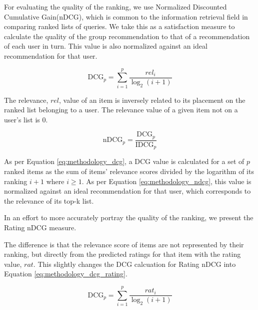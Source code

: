 \label{sec:methodology_ndcg}
For evaluating the quality of the ranking, we use Normalized Discounted Cumulative Gain(nDCG), which is common to the information retrieval field in comparing ranked lists of queries\cite{ndcg}. We take this as a satisfaction measure to calculate the quality of the group recommendation to that of a recommendation of each user in turn. This value is also normalized against an ideal recommendation for that user.


\begin{equation}\label{eq:methodology_dcg}
\text{DCG}_p = \sum_{i=1}^{p}\frac{\textit{rel}_i}{\log_2(i + 1)}
\end{equation}

The relevance, $rel$, value of an item is inversely related to its placement on the ranked list belonging to a user. The relevance value of a given item not on a user's list is 0.

\begin{equation}\label{eq:methodology_ndcg}
\text{nDCG}_p = \frac{\text{DCG}_p}{\text{IDCG}_p}
\end{equation}

As per Equation \ref{eq:methodology_dcg}, a DCG value is calculated for a set of $p$ ranked items as the sum of items' relevance scores divided by the logarithm of its ranking $i + 1$ where $i \geq 1$. As per Equation \ref{eq:methodology_ndcg}, this value is normalized against an ideal recommendation for that user, which corresponds to the relevance of its top-k list.

In an effort to more accurately portray the quality of the ranking, we present the Rating nDCG measure.

The difference is that the relevance score of items are not represented by their ranking, but directly from the predicted ratings for that item with the rating value, $rat$. This slightly changes the DCG calcuation for Rating nDCG into Equation \ref{eq:methodology_dcg_rating}.

\begin{equation}\label{eq:methodology_dcg_rating}
\text{DCG}_p = \sum_{i=1}^{p}\frac{\textit{rat}_i}{\log_2(i + 1)}
\end{equation}

